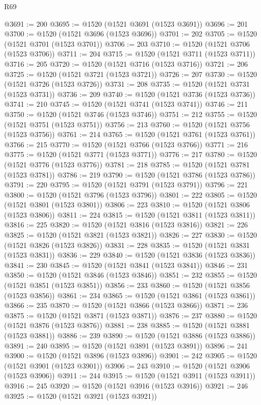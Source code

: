 \begin{lexlean}{R69}
\begin{coremodule}
{@3691 := 200
@3695 := @1520 (@1521 @3691 (@1523 @3691))
@3696 := 201
@3700 := @1520 (@1521 @3696 (@1523 @3696))
@3701 := 202
@3705 := @1520 (@1521 @3701 (@1523 @3701))
@3706 := 203
@3710 := @1520 (@1521 @3706 (@1523 @3706))
@3711 := 204
@3715 := @1520 (@1521 @3711 (@1523 @3711))
@3716 := 205
@3720 := @1520 (@1521 @3716 (@1523 @3716))
@3721 := 206
@3725 := @1520 (@1521 @3721 (@1523 @3721))
@3726 := 207
@3730 := @1520 (@1521 @3726 (@1523 @3726))
@3731 := 208
@3735 := @1520 (@1521 @3731 (@1523 @3731))
@3736 := 209
@3740 := @1520 (@1521 @3736 (@1523 @3736))
@3741 := 210
@3745 := @1520 (@1521 @3741 (@1523 @3741))
@3746 := 211
@3750 := @1520 (@1521 @3746 (@1523 @3746))
@3751 := 212
@3755 := @1520 (@1521 @3751 (@1523 @3751))
@3756 := 213
@3760 := @1520 (@1521 @3756 (@1523 @3756))
@3761 := 214
@3765 := @1520 (@1521 @3761 (@1523 @3761))
@3766 := 215
@3770 := @1520 (@1521 @3766 (@1523 @3766))
@3771 := 216
@3775 := @1520 (@1521 @3771 (@1523 @3771))
@3776 := 217
@3780 := @1520 (@1521 @3776 (@1523 @3776))
@3781 := 218
@3785 := @1520 (@1521 @3781 (@1523 @3781))
@3786 := 219
@3790 := @1520 (@1521 @3786 (@1523 @3786))
@3791 := 220
@3795 := @1520 (@1521 @3791 (@1523 @3791))
@3796 := 221
@3800 := @1520 (@1521 @3796 (@1523 @3796))
@3801 := 222
@3805 := @1520 (@1521 @3801 (@1523 @3801))
@3806 := 223
@3810 := @1520 (@1521 @3806 (@1523 @3806))
@3811 := 224
@3815 := @1520 (@1521 @3811 (@1523 @3811))
@3816 := 225
@3820 := @1520 (@1521 @3816 (@1523 @3816))
@3821 := 226
@3825 := @1520 (@1521 @3821 (@1523 @3821))
@3826 := 227
@3830 := @1520 (@1521 @3826 (@1523 @3826))
@3831 := 228
@3835 := @1520 (@1521 @3831 (@1523 @3831))
@3836 := 229
@3840 := @1520 (@1521 @3836 (@1523 @3836))
@3841 := 230
@3845 := @1520 (@1521 @3841 (@1523 @3841))
@3846 := 231
@3850 := @1520 (@1521 @3846 (@1523 @3846))
@3851 := 232
@3855 := @1520 (@1521 @3851 (@1523 @3851))
@3856 := 233
@3860 := @1520 (@1521 @3856 (@1523 @3856))
@3861 := 234
@3865 := @1520 (@1521 @3861 (@1523 @3861))
@3866 := 235
@3870 := @1520 (@1521 @3866 (@1523 @3866))
@3871 := 236
@3875 := @1520 (@1521 @3871 (@1523 @3871))
@3876 := 237
@3880 := @1520 (@1521 @3876 (@1523 @3876))
@3881 := 238
@3885 := @1520 (@1521 @3881 (@1523 @3881))
@3886 := 239
@3890 := @1520 (@1521 @3886 (@1523 @3886))
@3891 := 240
@3895 := @1520 (@1521 @3891 (@1523 @3891))
@3896 := 241
@3900 := @1520 (@1521 @3896 (@1523 @3896))
@3901 := 242
@3905 := @1520 (@1521 @3901 (@1523 @3901))
@3906 := 243
@3910 := @1520 (@1521 @3906 (@1523 @3906))
@3911 := 244
@3915 := @1520 (@1521 @3911 (@1523 @3911))
@3916 := 245
@3920 := @1520 (@1521 @3916 (@1523 @3916))
@3921 := 246
@3925 := @1520 (@1521 @3921 (@1523 @3921))
}
\end{coremodule}
\end{lexlean}
